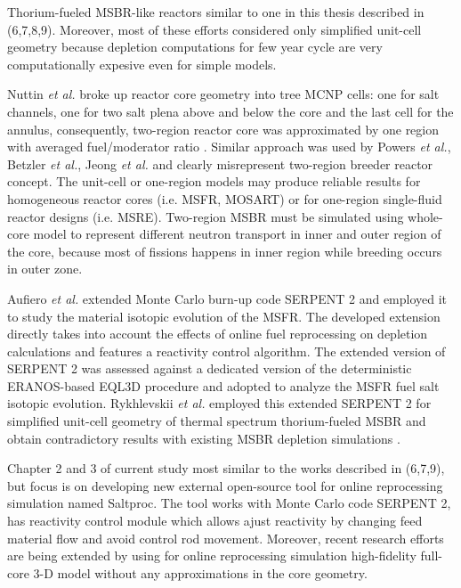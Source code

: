 Thorium-fueled \gls{MSBR}-like reactors similar to one in this thesis described in (6,7,8,9). Moreover, most of these efforts considered only simplified unit-cell geometry because depletion computations for few year cycle are very computationally expesive even for simple models. 

Nuttin \emph{et al.} broke up reactor core geometry into tree \gls{MCNP} cells: one for salt channels, one for two salt plena above and below the core and the last cell for the annulus, consequently, two-region reactor core was approximated by one region with averaged fuel/moderator ratio \cite{nuttin_potential_2005}.  Similar approach was used by Powers \emph{et al.}, Betzler \emph{et al.}, Jeong \emph{et al.} \cite{powers_new_2013,powers_inventory_2014,betzler_modeling_2016, betzler_molten_2017, jeong_development_2014, jeong_equilibrium_2016} and clearly misrepresent two-region breeder reactor concept. The unit-cell or one-region models may produce reliable results for homogeneous reactor cores (i.e. \gls{MSFR}, \gls{MOSART}) or for one-region single-fluid reactor designs (i.e. \gls{MSRE}). Two-region \gls{MSBR} must be simulated using whole-core model to represent different neutron transport in inner and outer region of the core, because most of fissions happens in inner region while breeding occurs in outer zone.  

Aufiero \emph{et al.} extended Monte Carlo burn-up code SERPENT 2 and employed it to study the material isotopic evolution of the \gls{MSFR}. The developed extension directly takes into account the effects of online fuel reprocessing on depletion calculations and features a reactivity control algorithm. The extended version of SERPENT 2 was assessed against a dedicated version of the deterministic ERANOS-based EQL3D procedure \cite{ruggieri_eranos_2006} and adopted to analyze the \gls{MSFR} fuel salt isotopic evolution. Rykhlevskii \emph{et al.} employed this extended SERPENT 2 for simplified unit-cell geometry of thermal spectrum thorium-fueled \gls{MSBR} and obtain contradictory results with existing \gls{MSBR} depletion simulations \cite{jeong_equilibrium_2016}.

Chapter 2 and 3 of current study most similar to the works described in (6,7,9), but focus is on developing new external open-source tool for online reprocessing simulation named Saltproc. The tool works with Monte Carlo code SERPENT 2, has reactivity control module which allows ajust reactivity by changing feed material flow and avoid control rod movement. Moreover, recent research efforts are being extended by using for online reprocessing simulation high-fidelity full-core 3-D model without any approximations in the core geometry.

